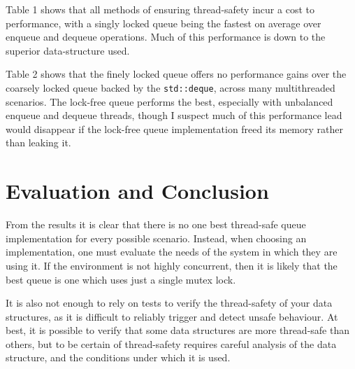 \documentclass{article}
\begin{document}
Table 1 shows that all methods of ensuring thread-safety incur a cost to
performance, with a singly locked queue being the fastest on average over
enqueue and dequeue operations. Much of this performance is down to the
superior data-structure used.

Table 2 shows that the finely locked queue offers no performance gains over
the coarsely locked queue backed by the \verb|std::deque|, across many
multithreaded scenarios. The lock-free queue performs the best, especially
with unbalanced enqueue and dequeue threads, though I suspect much of this
performance lead would disappear if the lock-free queue implementation
freed its memory rather than leaking it.

\section{Evaluation and Conclusion}
From the results it is clear that there is no one best thread-safe queue
implementation for every possible scenario. Instead, when choosing an
implementation, one must evaluate the needs of the system in which they are
using it. If the environment is not highly concurrent, then it is likely that
the best queue is one which uses just a single mutex lock.  

It is also not enough to rely on tests to verify the thread-safety of your
data structures, as it is difficult to reliably trigger and detect unsafe
behaviour. At best, it is possible to verify that some data structures are more
thread-safe than others, but to be certain of thread-safety requires careful
analysis of the data structure, and the conditions under which it is used.

\nocite{*}

\end{document}

